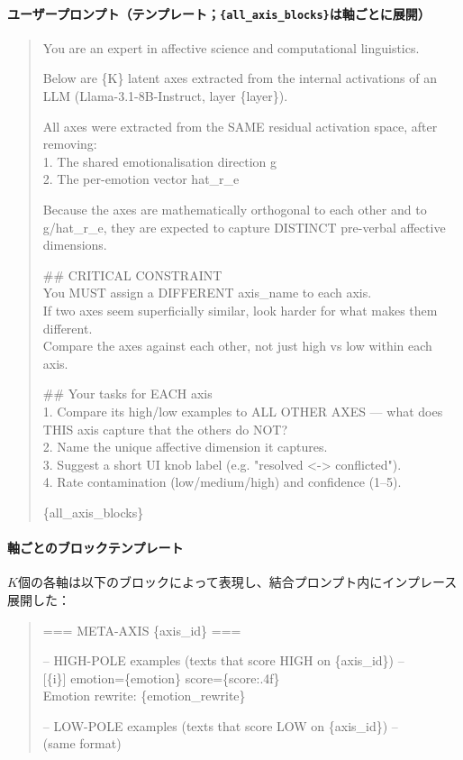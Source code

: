 \paragraph{ユーザープロンプト（テンプレート；\texttt{\{all\_axis\_blocks\}}は軸ごとに展開）}
\begin{quote}
\small\ttfamily
You are an expert in affective science and computational linguistics.
\par\medskip
Below are \{K\} latent axes extracted from the internal activations of an LLM
(Llama-3.1-8B-Instruct, layer \{layer\}).
\par
All axes were extracted from the SAME residual activation space, after removing:\\
1. The shared emotionalisation direction g\\
2. The per-emotion vector hat\_r\_e
\par
Because the axes are mathematically orthogonal to each other and to g/hat\_r\_e, they
are expected to capture DISTINCT pre-verbal affective dimensions.
\par\medskip
\#\# CRITICAL CONSTRAINT\\
You MUST assign a DIFFERENT axis\_name to each axis.\\
If two axes seem superficially similar, look harder for what makes them different.\\
Compare the axes against each other, not just high vs low within each axis.
\par\medskip
\#\# Your tasks for EACH axis\\
1. Compare its high/low examples to ALL OTHER AXES --- what does THIS axis capture
that the others do NOT?\\
2. Name the unique affective dimension it captures.\\
3. Suggest a short UI knob label (e.g. "resolved <-> conflicted").\\
4. Rate contamination (low/medium/high) and confidence (1--5).
\par\medskip
\{all\_axis\_blocks\}
\end{quote}

\paragraph{軸ごとのブロックテンプレート}

$K$個の各軸は以下のブロックによって表現し、結合プロンプト内にインプレース展開した：
\begin{quote}
\small\ttfamily
=== META-AXIS \{axis\_id\} ===
\par
-- HIGH-POLE examples (texts that score HIGH on \{axis\_id\}) --\\
{[}\{i\}{]} emotion=\{emotion\}  score=\{score:.4f\}\\
\phantom{x}Emotion rewrite: \{emotion\_rewrite\}
\par
-- LOW-POLE examples (texts that score LOW on \{axis\_id\}) --\\
(same format)
\end{quote}

